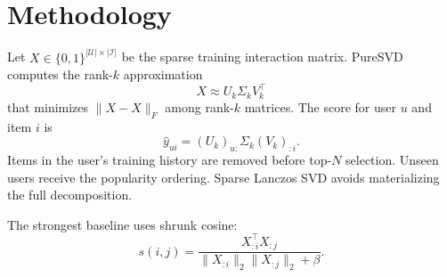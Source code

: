 \section{Methodology}
Let $X\in\{0,1\}^{|\mathcal U|\times|\mathcal I|}$ be the sparse training
interaction matrix. PureSVD computes the rank-$k$ approximation
\[
X\approx U_k\Sigma_kV_k^\top
\]
that minimizes $\|X-\hat X\|_F$ among rank-$k$ matrices. The score for user
$u$ and item $i$ is
\[
\hat y_{ui}=(U_k)_{u:}\Sigma_k(V_k)_{:i}.
\]
Items in the user's training history are removed before top-$N$ selection.
Unseen users receive the popularity ordering. Sparse Lanczos SVD avoids
materializing the full decomposition.

The strongest baseline uses shrunk cosine:
\[
s(i,j)=\frac{X_{:i}^{\top}X_{:j}}
{\|X_{:i}\|_2\|X_{:j}\|_2+\beta}.
\]

